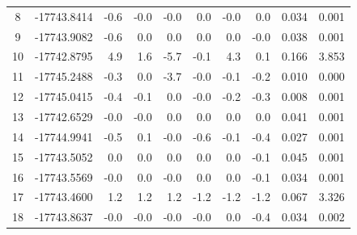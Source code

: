 \begin{longtable}{@{}crrrrrrrrr@{}}
8 & -17743.8414 & \textcolor{blue!28}{-0.6} & \textcolor{blue!20}{-0.0} & \textcolor{blue!20}{-0.0} & \textcolor{red!20}{0.0} & \textcolor{blue!20}{-0.0} & \textcolor{red!20}{0.0} & 0.034 & 0.001 \\
9 & -17743.9082 & \textcolor{blue!27}{-0.6} & \textcolor{red!20}{0.0} & \textcolor{red!20}{0.0} & \textcolor{red!20}{0.0} & \textcolor{red!20}{0.0} & \textcolor{blue!20}{-0.0} & 0.038 & 0.001 \\
10 & -17742.8795 & \textcolor{red!88}{4.9} & \textcolor{red!41}{1.6} & \textcolor{blue!100}{-5.7} & \textcolor{blue!21}{-0.1} & \textcolor{red!79}{4.3} & \textcolor{red!21}{0.1} & 0.166 & 3.853 \\
11 & -17745.2488 & \textcolor{blue!23}{-0.3} & \textcolor{red!20}{0.0} & \textcolor{blue!71}{-3.7} & \textcolor{blue!20}{-0.0} & \textcolor{blue!21}{-0.1} & \textcolor{blue!22}{-0.2} & 0.010 & 0.000 \\
12 & -17745.0415 & \textcolor{blue!25}{-0.4} & \textcolor{blue!21}{-0.1} & \textcolor{red!20}{0.0} & \textcolor{blue!20}{-0.0} & \textcolor{blue!22}{-0.2} & \textcolor{blue!24}{-0.3} & 0.008 & 0.001 \\
13 & -17742.6529 & \textcolor{blue!20}{-0.0} & \textcolor{blue!20}{-0.0} & \textcolor{red!20}{0.0} & \textcolor{red!20}{0.0} & \textcolor{red!20}{0.0} & \textcolor{red!20}{0.0} & 0.041 & 0.001 \\
14 & -17744.9941 & \textcolor{blue!27}{-0.5} & \textcolor{red!21}{0.1} & \textcolor{blue!20}{-0.0} & \textcolor{blue!28}{-0.6} & \textcolor{blue!21}{-0.1} & \textcolor{blue!25}{-0.4} & 0.027 & 0.001 \\
15 & -17743.5052 & \textcolor{red!20}{0.0} & \textcolor{red!20}{0.0} & \textcolor{red!20}{0.0} & \textcolor{red!20}{0.0} & \textcolor{red!20}{0.0} & \textcolor{blue!21}{-0.1} & 0.045 & 0.001 \\
16 & -17743.5569 & \textcolor{blue!20}{-0.0} & \textcolor{red!20}{0.0} & \textcolor{blue!20}{-0.0} & \textcolor{red!20}{0.0} & \textcolor{red!20}{0.0} & \textcolor{blue!21}{-0.1} & 0.034 & 0.001 \\
17 & -17743.4600 & \textcolor{red!36}{1.2} & \textcolor{red!36}{1.2} & \textcolor{red!36}{1.2} & \textcolor{blue!36}{-1.2} & \textcolor{blue!36}{-1.2} & \textcolor{blue!37}{-1.2} & 0.067 & 3.326 \\
18 & -17743.8637 & \textcolor{blue!20}{-0.0} & \textcolor{blue!20}{-0.0} & \textcolor{blue!20}{-0.0} & \textcolor{blue!20}{-0.0} & \textcolor{red!20}{0.0} & \textcolor{blue!25}{-0.4} & 0.034 & 0.002 \\

\end{longtable}
